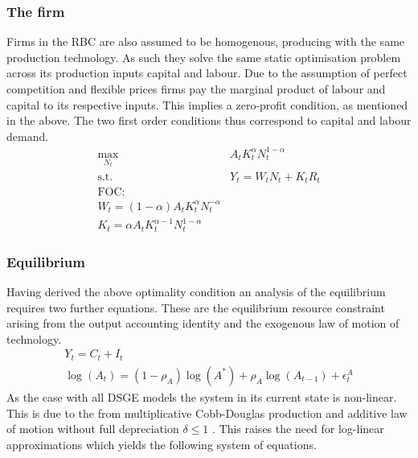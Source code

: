 \documentclass[12pt,a4paper,english]{article} %
\begin{document}
	\subsubsection{The firm}
	Firms in the RBC are also assumed to be homogenous, producing with the same production technology. As such they solve the same static optimisation problem across its production inputs capital and labour. Due to the assumption of perfect competition and flexible prices firms pay the marginal product of labour and capital to its respective inputs. This implies a zero-profit condition, as mentioned in the above. The two first order conditions thus correspond to capital and labour demand.
	\begin{equation}
		\begin{aligned}
			\max_{N_t} \quad & A_t K_t^\alpha N_t^{1 - \alpha} \\
			\textrm{s.t.} \quad & Y_t = W_t N_t + K_t R_t\\
			\textrm{FOC:} \\
			W_t = (1 - \alpha) A_t K_t^\alpha N_t^{-\alpha}\\
			K_t = \alpha A_t K_t^{\alpha -1} N_t^{1-\alpha}
		\end{aligned}
	\end{equation}

	\subsubsection{Equilibrium}
	Having derived the above optimality condition an analysis of the equilibrium requires two further equations. These are the equilibrium resource constraint arising from the output accounting identity and the exogenous law of motion of technology.
	\begin{equation}
		\begin{aligned}
			Y_t = C_t + I_t \\
			\log(A_t) = (1- \rho_A) \log(A^*) + \rho_A \log(A_{t-1}) + \epsilon_t^A
		\end{aligned}
	\end{equation}
	As the case with all DSGE models the system in its current state is non-linear. This is due to the from multiplicative Cobb-Douglas production and additive law of motion without full depreciation $\delta \leq 1$ \cite{campbell_inspecting_1994}. This raises the need for log-linear approximations which yields the following system of equations. \\
	
\end{document}
